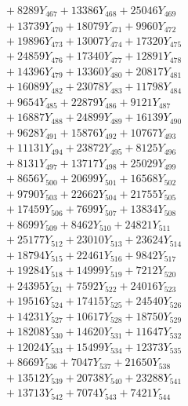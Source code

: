 \documentclass[a4paper,10pt]{article}
\begin{document}
{\begin{align}
&\;  + 8289 Y_{467} + 13386 Y_{468} + 25046 Y_{469} \\[0.3ex]
&\;  + 13739 Y_{470} + 18079 Y_{471} + 9960 Y_{472} \\[0.3ex]
&\;  + 19896 Y_{473} + 13007 Y_{474} + 17320 Y_{475} \\[0.3ex]
&\;  + 24859 Y_{476} + 17340 Y_{477} + 12891 Y_{478} \\[0.5ex]\allowbreak
&\;  + 14396 Y_{479} + 13360 Y_{480} + 20817 Y_{481} \\[0.3ex]
&\;  + 16089 Y_{482} + 23078 Y_{483} + 11798 Y_{484} \\[0.3ex]
&\;  + 9654 Y_{485} + 22879 Y_{486} + 9121 Y_{487} \\[0.3ex]
&\;  + 16887 Y_{488} + 24899 Y_{489} + 16139 Y_{490} \\[0.3ex]
&\;  + 9628 Y_{491} + 15876 Y_{492} + 10767 Y_{493} \\[0.3ex]
&\;  + 11131 Y_{494} + 23872 Y_{495} + 8125 Y_{496} \\[0.3ex]
&\;  + 8131 Y_{497} + 13717 Y_{498} + 25029 Y_{499} \\[0.3ex]
&\;  + 8656 Y_{500} + 20699 Y_{501} + 16568 Y_{502} \\[0.3ex]
&\;  + 9790 Y_{503} + 22662 Y_{504} + 21755 Y_{505} \\[0.3ex]
&\;  + 17459 Y_{506} + 7699 Y_{507} + 13834 Y_{508} \\[0.5ex]\allowbreak
&\;  + 8699 Y_{509} + 8462 Y_{510} + 24821 Y_{511} \\[0.3ex]
&\;  + 25177 Y_{512} + 23010 Y_{513} + 23624 Y_{514} \\[0.3ex]
&\;  + 18794 Y_{515} + 22461 Y_{516} + 9842 Y_{517} \\[0.3ex]
&\;  + 19284 Y_{518} + 14999 Y_{519} + 7212 Y_{520} \\[0.3ex]
&\;  + 24395 Y_{521} + 7592 Y_{522} + 24016 Y_{523} \\[0.3ex]
&\;  + 19516 Y_{524} + 17415 Y_{525} + 24540 Y_{526} \\[0.3ex]
&\;  + 14231 Y_{527} + 10617 Y_{528} + 18750 Y_{529} \\[0.3ex]
&\;  + 18208 Y_{530} + 14620 Y_{531} + 11647 Y_{532} \\[0.3ex]
&\;  + 12024 Y_{533} + 15499 Y_{534} + 12373 Y_{535} \\[0.3ex]
&\;  + 8669 Y_{536} + 7047 Y_{537} + 21650 Y_{538} \\[0.5ex]\allowbreak
&\;  + 13512 Y_{539} + 20738 Y_{540} + 23288 Y_{541} \\[0.3ex]
&\;  + 13713 Y_{542} + 7074 Y_{543} + 7421 Y_{544} \\[0.3ex]

\end{align}}
\end{document}
